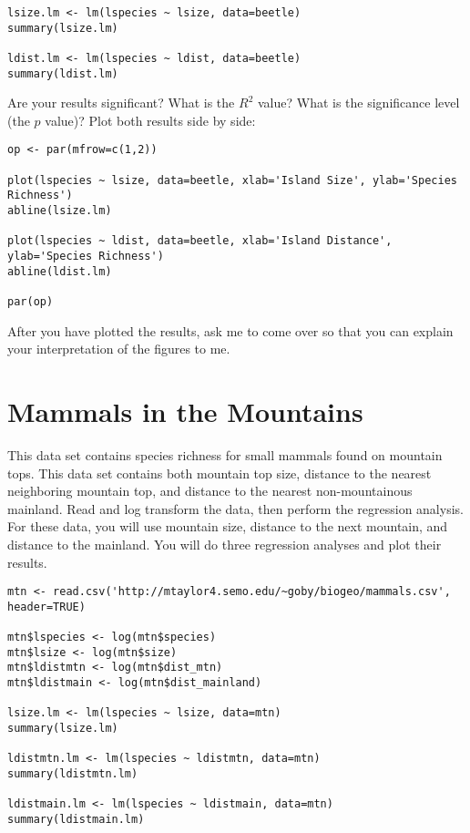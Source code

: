 \documentclass[11pt]{article}
\begin{document}
\begin{verbatim}
lsize.lm <- lm(lspecies ~ lsize, data=beetle)
summary(lsize.lm)

ldist.lm <- lm(lspecies ~ ldist, data=beetle)
summary(ldist.lm)

\end{verbatim}

Are your results significant?  What is the $R^2$ value?  What is the significance level (the $p$ value)?  Plot both results side by side:

\begin{verbatim}
op <- par(mfrow=c(1,2))

plot(lspecies ~ lsize, data=beetle, xlab='Island Size', ylab='Species Richness')
abline(lsize.lm)

plot(lspecies ~ ldist, data=beetle, xlab='Island Distance', ylab='Species Richness')
abline(ldist.lm)

par(op)
\end{verbatim}

After you have plotted the results, ask me to come over so that you can explain your interpretation of the figures to me.

\section{Mammals in the Mountains}

This data set contains species richness for small mammals found on mountain tops. This data set contains both mountain top size, distance to the nearest neighboring mountain top, and distance to the nearest non-mountainous mainland.  Read and log transform the data, then perform the regression analysis.  For these data, you will use mountain size, distance to the next mountain, and distance to the mainland.  You will do three regression analyses and plot their results.


\begin{verbatim}
mtn <- read.csv('http://mtaylor4.semo.edu/~goby/biogeo/mammals.csv', header=TRUE)

mtn$lspecies <- log(mtn$species)
mtn$lsize <- log(mtn$size)
mtn$ldistmtn <- log(mtn$dist_mtn)
mtn$ldistmain <- log(mtn$dist_mainland)

lsize.lm <- lm(lspecies ~ lsize, data=mtn)
summary(lsize.lm)

ldistmtn.lm <- lm(lspecies ~ ldistmtn, data=mtn)
summary(ldistmtn.lm)

ldistmain.lm <- lm(lspecies ~ ldistmain, data=mtn)
summary(ldistmain.lm)

\end{verbatim}
\end{document}
